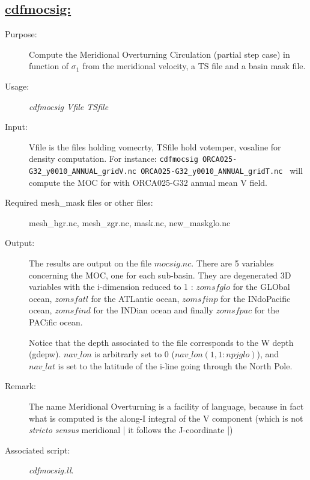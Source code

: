 \documentclass[a4paper,11pt]{article}
\begin{document}
\subsection*{\underline{cdfmocsig:}}
\begin{description}
\item[Purpose:] Compute the Meridional Overturning Circulation (partial step case) in function of $\sigma_1$  from the meridional velocity, a TS file and a basin mask file.
\item[Usage:] {\em cdfmocsig  Vfile TSfile}
\item[Input:] Vfile is the files holding vomecrty, TSfile hold votemper, vosaline for density computation.
For instance: {\tt cdfmocsig ORCA025-G32\_y0010\_ANNUAL\_gridV.nc ORCA025-G32\_y0010\_ANNUAL\_gridT.nc }
will compute the MOC for with ORCA025-G32 annual mean V field.
\item[Required mesh\_mask files or other files:]   mesh\_hgr.nc, mesh\_zgr.nc, mask.nc, new\_maskglo.nc   \\
\item[Output:] The results are output on the file $mocsig.nc$. There are 5 variables concerning the MOC, one for each sub-basin. They are degenerated 3D variables with the i-dimension
reduced to 1 : $zomsfglo$ for the GLObal ocean,
$zomsfatl$ for the ATLantic ocean, $zomsfinp$ for the INdoPacific ocean, $zomsfind$ for the INDian ocean and finally
$zomsfpac$ for the PACific ocean. 

Notice that the depth associated to the file corresponds to the W depth (gdepw). $nav\_lon$ is arbitrarly set to 0 ($nav\_lon(1,1:npjglo)$),
and $nav\_lat$ is set to the latitude of the i-line going through the North Pole.
\item[Remark:]  The name Meridional Overturning is a facility of language, because in fact what is computed is the along-I integral
of the V component (which is not {\em stricto sensus} meridional | it follows the J-coordinate |)
\item[Associated script:] {\em cdfmocsig.ll}.
\end{description}

\newpage
\end{document}
